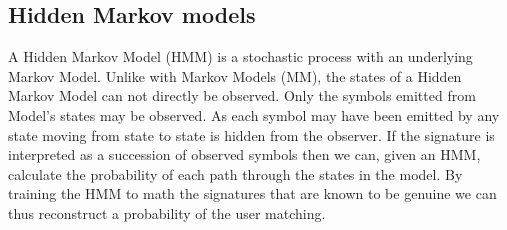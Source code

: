 \documentclass[a4paper, oneside]{csthesis}
\begin{document}







\subsection{Hidden Markov models}


A Hidden Markov Model (HMM) is a stochastic process with an underlying Markov Model.
Unlike with Markov Models (MM), the states of a Hidden Markov Model can not directly be observed. Only the symbols emitted from Model's states may be observed. As each symbol may have been emitted by any state moving from state to state is hidden from the observer. If the signature is interpreted as a succession of observed symbols then we can, given an HMM, calculate the probability of each path through the states in the model. By training the HMM to math the signatures that are known to be genuine we can thus reconstruct a probability of the user matching.
\end{document}

